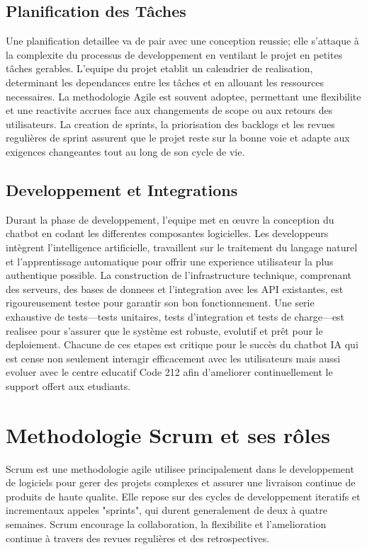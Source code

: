 \documentclass[a4paper, 11pt, openany]{report}
\begin{document}
\subsection{Planification des Tâches}
Une planification detaillee va de pair avec une conception reussie; elle s'attaque à la complexite du processus de developpement en ventilant le projet en petites tâches gerables. L'equipe du projet etablit un calendrier de realisation, determinant les dependances entre les tâches et en allouant les ressources necessaires. La methodologie Agile est souvent adoptee, permettant une flexibilite et une reactivite accrues face aux changements de scope ou aux retours des utilisateurs. La creation de sprints, la priorisation des backlogs et les revues regulières de sprint assurent que le projet reste sur la bonne voie et adapte aux exigences changeantes tout au long de son cycle de vie.

\subsection{Developpement et Integrations}
Durant la phase de developpement, l'equipe met en œuvre la conception du chatbot en codant les differentes composantes logicielles. Les developpeurs intègrent l'intelligence artificielle, travaillent sur le traitement du langage naturel et l'apprentissage automatique pour offrir une experience utilisateur la plus authentique possible. La construction de l'infrastructure technique, comprenant des serveurs, des bases de donnees et l'integration avec les API existantes, est rigoureusement testee pour garantir son bon fonctionnement. Une serie exhaustive de tests—tests unitaires, tests d'integration et tests de charge—est realisee pour s'assurer que le système est robuste, evolutif et prêt pour le deploiement.
Chacune de ces etapes est critique pour le succès du chatbot IA qui est cense non seulement interagir efficacement avec les utilisateurs mais aussi evoluer avec le centre educatif Code 212 afin d'ameliorer continuellement le support offert aux etudiants.


\section{Methodologie Scrum et ses rôles}

Scrum est une methodologie agile utilisee principalement dans le developpement de logiciels pour gerer des projets complexes et assurer une livraison continue de produits de haute qualite. Elle repose sur des cycles de developpement iteratifs et incrementaux appeles "sprints", qui durent generalement de deux à quatre semaines. Scrum encourage la collaboration, la flexibilite et l'amelioration continue à travers des revues regulières et des retrospectives.
\end{document}
